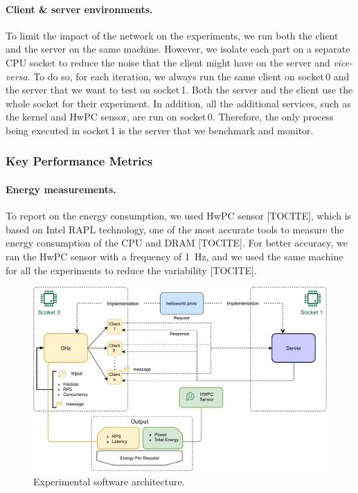 \paragraph{Client \& server environments.}
To limit the impact of the network on the experiments, we run both the client and the server on the same machine.
However, we isolate each part on a separate CPU socket to reduce the noise that the client might have on the server and \emph{vice-versa}.
To do so, for each iteration, we always run the same client on \textsf{socket\,0} and the server that we want to test on \textsf{socket\,1}.
Both the server and the client use the whole socket for their experiment.
In addition, all the additional services, such as the kernel and HwPC sensor, are run on \textsf{socket\,0}.
Therefore, the only process being executed in \textsf{socket\,1} is the server that we benchmark and monitor.

\subsubsection{Key Performance Metrics}
\paragraph{Energy measurements.}
To report on the energy consumption, we used HwPC sensor [TOCITE], which is based on Intel RAPL technology, one of the most accurate tools to measure the energy consumption of the CPU and DRAM [TOCITE].
For better accuracy, we ran the HwPC sensor with a frequency of 1~Hz, and we used the same machine for all the experiments to reduce the variability [TOCITE].

\begin{figure}[!hbt]
    \begin{center}
        \includegraphics[width=.8\linewidth]{imgs/rpcprotocol}
    \end{center}
    \caption{Experimental software architecture.}\label{fig:rpcprotocol}
\end{figure}



